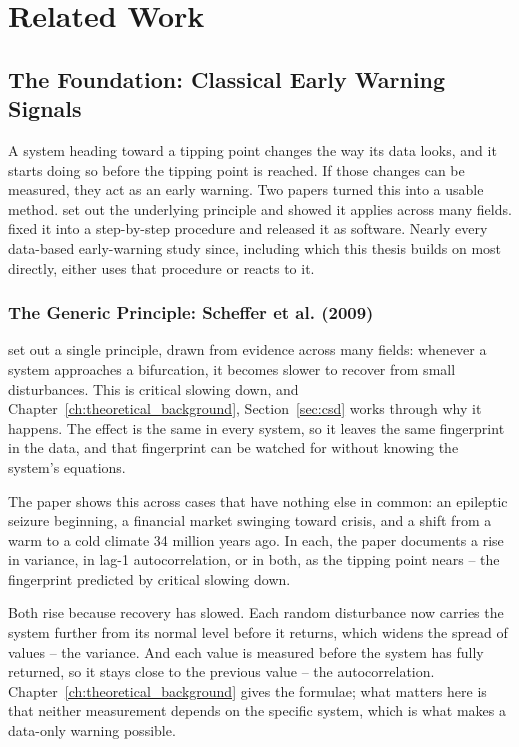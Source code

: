 \chapter{Related Work}
\label{ch:related_work}

\section{The Foundation: Classical Early Warning Signals}
A system heading toward a tipping point changes the way its data looks, and it starts doing so before the tipping point is reached. If those changes can be measured, they act as an early warning. Two papers turned this into a usable method. \citet{scheffer2009} set out the underlying principle and showed it applies across many fields. \citet{dakos2012} fixed it into a step-by-step procedure and released it as software. Nearly every data-based early-warning study since, including \citet{bury2021} which this thesis builds on most directly, either uses that procedure or reacts to it.

\subsection{The Generic Principle: Scheffer et al. (2009)}
\citet{scheffer2009} set out a single principle, drawn from evidence across many fields: whenever a system approaches a bifurcation, it becomes slower to recover from small disturbances. This is critical slowing down, and Chapter~\ref{ch:theoretical_background}, Section~\ref{sec:csd} works through why it happens. The effect is the same in every system, so it leaves the same fingerprint in the data, and that fingerprint can be watched for without knowing the system's equations.

The paper shows this across cases that have nothing else in common: an epileptic seizure beginning, a financial market swinging toward crisis, and a shift from a warm to a cold climate 34 million years ago. In each, the paper documents a rise in variance, in lag-1 autocorrelation, or in both, as the tipping point nears -- the fingerprint predicted by critical slowing down.

Both rise because recovery has slowed. Each random disturbance now carries the system further from its normal level before it returns, which widens the spread of values -- the variance. And each value is measured before the system has fully returned, so it stays close to the previous value -- the autocorrelation. Chapter~\ref{ch:theoretical_background} gives the formulae; what matters here is that neither measurement depends on the specific system, which is what makes a data-only warning possible.

